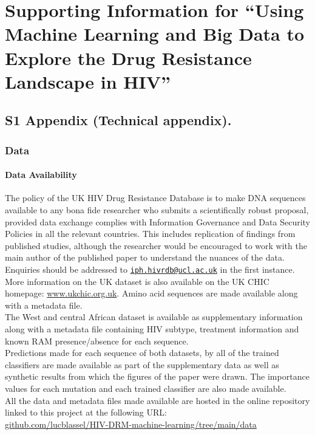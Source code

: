\documentclass[
  11pt,
  twoside,
  BCOR=10mm,
  listof=totoc]{scrbook}
\begin{document}
\hypertarget{HIV-appendix}{%
\chapter{Supporting Information for ``Using Machine Learning and Big Data to Explore the Drug Resistance Landscape in HIV''}\label{HIV-appendix}}

\hypertarget{S1-Appendix}{%
\section{S1 Appendix (Technical appendix).}\label{S1-Appendix}}

\hypertarget{data-appendix}{%
\subsection{Data}\label{data-appendix}}

\hypertarget{data-availability}{%
\subsubsection{Data Availability}\label{data-availability}}

The policy of the UK HIV Drug Resistance Database is to make DNA sequences available to any bona fide researcher who submits a scientifically robust proposal, provided data exchange complies with Information Governance and Data Security Policies in all the relevant countries. This includes replication of findings from published studies, although the researcher would be encouraged to work with the main author of the published paper to understand the nuances of the data. Enquiries should be addressed to \href{mailto:iph.hivrdb@ucl.ac.uk}{\nolinkurl{iph.hivrdb@ucl.ac.uk}} in the first instance. More information on the UK dataset is also available on the UK CHIC homepage: \href{http://www.ukchic.org.uk/}{www.ukchic.org.uk}. Amino acid sequences are made available along with a metadata file.\\
The West and central African dataset is available as supplementary information along with a metadata file containing HIV subtype, treatment information and known RAM presence/absence for each sequence.\\
Predictions made for each sequence of both datasets, by all of the trained classifiers are made available as part of the supplementary data as well as synthetic results from which the figures of the paper were drawn. The importance values for each mutation and each trained classifier are also made available.\\
All the data and metadata files made available are hosted in the online repository linked to this project at the following URL:\\
\href{https://github.com/lucblassel/HIV-DRM-machine-learning/tree/main/data}{github.com/lucblassel/HIV-DRM-machine-learning/tree/main/data}
\end{document}
